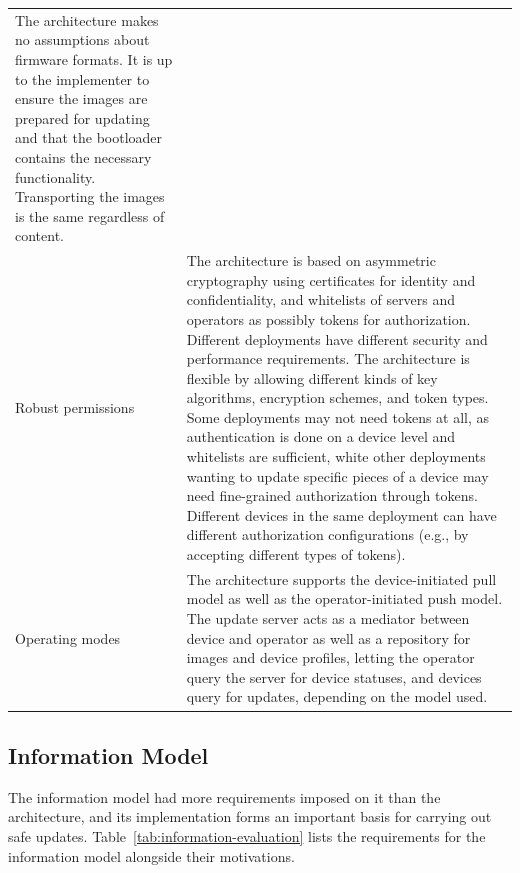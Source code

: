 \documentclass[0-thesis.tex]{subfiles}
\begin{document}
\begin{small}
\begin{longtable}[]{@{}ll@{}}
\begin{minipage}[t]{0.53\columnwidth}
    The architecture makes no assumptions about firmware formats. It is up
    to the implementer to ensure the images are prepared for updating and
    that the bootloader contains the necessary functionality. Transporting
    the images is the same regardless of content.\strut
    \end{minipage}\tabularnewline
    \begin{minipage}[t]{0.41\columnwidth}\raggedright\strut
    Robust permissions\strut
    \end{minipage} & \begin{minipage}[t]{0.53\columnwidth}\raggedright\strut
    The architecture is based on asymmetric cryptography using certificates
    for identity and confidentiality, and whitelists of servers and
    operators as possibly tokens for authorization. Different deployments
    have different security and performance requirements. The architecture
    is flexible by allowing different kinds of key algorithms, encryption
    schemes, and token types. Some deployments may not need tokens at all, as
    authentication is done on a device level and whitelists are sufficient,
    white other deployments wanting to update specific pieces of a device
    may need fine-grained authorization through tokens. Different devices in
    the same deployment can have different authorization configurations 
    (e.g., by accepting different types of tokens).\strut
    \end{minipage}\tabularnewline
    \begin{minipage}[t]{0.41\columnwidth}\raggedright\strut
    Operating modes\strut
    \end{minipage} & \begin{minipage}[t]{0.53\columnwidth}\raggedright\strut
    The architecture supports the device-initiated pull model as well as the
    operator-initiated push model. The update server acts as a mediator
    between device and operator as well as a repository for images and
    device profiles, letting the operator query the server for device
    statuses, and devices query for updates, depending on the model
    used.\strut
    \end{minipage}\tabularnewline
    \bottomrule
\end{longtable}
\end{small}
  
\subsection{Information Model}
\label{ssec:information-evaluation}
The information model had more requirements imposed on it than the architecture, and its
implementation forms an important basis for carrying out safe updates.
Table~\ref{tab:information-evaluation} lists the requirements for the information model
alongside their motivations.
\end{document}
